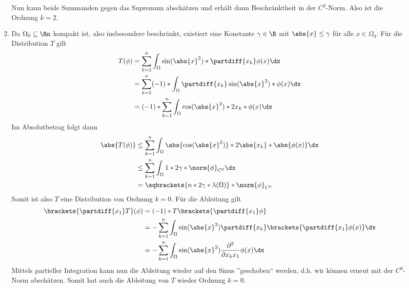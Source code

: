 \begin{exercisePage}
\begin{enumerate}[label=(zu \alph*), leftmargin=*]
\begin{enumerate}[label=(zu \roman*), leftmargin=*]
			Nun kann beide Summanden gegen das Supremum abschätzen und erhält dann Beschränktheit in der $C^2$-Norm. Also ist die Ordnung $k = 2$.
			\item Da $\Omega_0 \subseteq \Rn$ kompakt ist, also insbesondere beschränkt, existiert eine Konstante $\gamma \in \R$ mit $\abs{x} \le \gamma$ für alle $x \in \Omega_0$.
			Für die Distribution $T$ gilt
			\begin{equation*}
				\begin{aligned}
					T(\phi) &= \sum_{k=1}^n \int_\Omega \sin(\abs{x}^2) * \partdiff{x_k} \phi(x) \dx \\
					&= \sum_{k=1}^n (-1) * \int_\Omega \partdiff{x_k} \sin(\abs{x}^2) * \phi(x) \dx \\
					&= (-1) * \sum_{k=1}^n \int_\Omega \cos(\abs{x}^2) * 2x_k * \phi(x) \dx
				\end{aligned}
			\end{equation*}
			Im Absolutbetrag folgt dann
			\begin{equation*}
				\begin{aligned}
				\abs{T(\phi)} &\le \sum_{k=1}^n \int_\Omega \abs{\cos(\abs{x}^2)} * 2 \abs{x_k} * \abs{\phi(x)} \dx \\
				&\le \sum_{k=1}^n \int_\Omega 1 * 2 \gamma * \norm{\phi}_{C^0} \dx \\
				&= \sqbrackets{n * 2 \gamma * \lambda(\Omega)} * \norm{\phi}_{C^0}
				\end{aligned}
			\end{equation*}
			Somit ist also $T$ eine Distribution von Ordnung $k = 0$. 
			Für die Ableitung gilt
			\begin{equation*}
				\begin{aligned}
					\brackets{\partdiff{x_1} T}(\phi) &= (-1) * T\brackets{\partdiff{x_1} \phi} \\
					&= -\sum_{k=1}^n \int_\Omega \sin(\abs{x}^2) \partdiff{x_k} \brackets{\partdiff{x_1} \phi(x)} \dx \\
					&= - \sum_{k=1}^n \int_\Omega \sin(\abs{x}^2) \frac{\partial^2}{\partial x_k x_1} \phi(x) \dx 
				\end{aligned}
			\end{equation*}
			Mittels partieller Integration kann nun die Ableitung wieder auf den Sinus ''geschoben`` werden, d.h. wir können erneut mit der $C^0$-Norm abschätzen. Somit hat auch die Ableitung von $T$ wieder Ordnung $k=0$.
		\end{enumerate}
	\end{enumerate}


\end{exercisePage}
